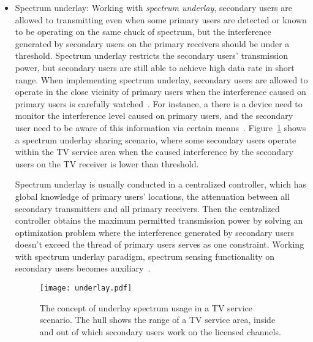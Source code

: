 \begin{itemize}
\item \label{underlay}  Spectrum underlay:
Working with \textit{spectrum underlay}, secondary users are allowed to transmitting even when some primary users are detected or known to be operating on the same chuck of spectrum, but the interference generated by secondary users on the primary receivers should be under a threshold. 
Spectrum underlay restricts the secondary users' transmission power, but secondary users are still able to achieve high data rate in short range.
When implementing spectrum underlay, secondary users are allowed to operate in the close vicinity of primary users when the interference caused on primary users is carefully watched~\cite{Ellingsaeter2012_Increasing_Available}.
For instance, a there is a device need to monitor the interference level caused on primary users, and the secondary user need to be aware of this information via certain means~\cite{HoangPowerChannel2010}.
Figure~\ref{underlay} shows a spectrum underlay sharing scenario, where some secondary users operate within the TV service area when the caused interference by the secondary users on the TV receiver is lower than threshold.

Spectrum underlay is usually conducted in a centralized controller, which has global knowledge of primary users' locations, the attenuation between all secondary transmitters and all primary receivers.
Then the centralized controller obtains the maximum permitted transmission power by solving an optimization problem where the interference generated by secondary users doesn't exceed the thread of primary users serves as one constraint.
Working with spectrum underlay paradigm, spectrum sensing functionality on secondary users becomes auxiliary~\cite{FCC_2010_sedond_memorandumm, ecc159}.
	\begin{figure}[h!]
	  \centering
	  \texttt{[image: underlay.pdf]}
	  \caption{The concept of underlay spectrum usage in a TV service scenario. The hull shows the range of a TV service area, inside and out of which secondary users work on the licensed channels.}
	\label{underlay}
	\end{figure}



\end{itemize}
